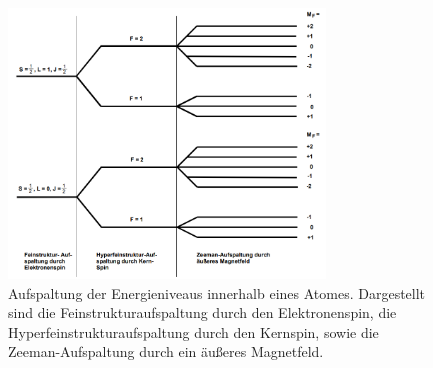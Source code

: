 \documentclass[
  bibliography=totoc,     %
  captions=tableheading,  %
  titlepage=firstiscover, %
]{scrartcl}
\begin{document}
%
\begin{figure}[h]
  \centering
  \includegraphics[width=0.75\textwidth]{Aufspaltung.jpg}
  \caption{Aufspaltung der Energieniveaus innerhalb eines Atomes. Dargestellt
  sind die Feinstrukturaufspaltung durch den Elektronenspin, die
  Hyperfeinstrukturaufspaltung durch den Kernspin, sowie die Zeeman-Aufspaltung
  durch ein äußeres Magnetfeld. \cite{anleitung}}
  \label{fig:aufspaltung}
\end{figure}
\end{document}
